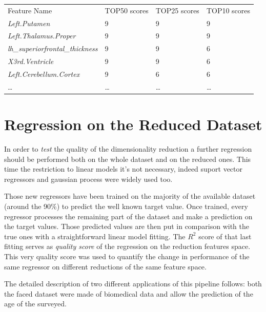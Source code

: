 \documentclass{article}
\begin{document}
\begin{table}[h]
\begin{tabular}{llll}
Feature Name                                        & TOP50 scores & TOP25 scores & TOP10 scores \\
\textit{Left.Putamen}                               & 9             & 9             & 9             \\
\textit{Left.Thalamus.Proper}                       & 9             & 9             & 9             \\
\textit{lh\_superiorfrontal\_thickness}             & 9             & 9             & 6             \\
\textit{X3rd.Ventricle}                             & 9             & 9             & 6             \\
\textit{Left.Cerebellum.Cortex}                     & 9             & 6             & 6             \\
\dots																								& \dots					&\dots 					&\dots
\end{tabular}
\end{table}



\section*{Regression on the Reduced Dataset}
In order to \emph{test} the quality of the dimensionality reduction a further regression should be performed both on the whole dataset and on the reduced ones. This time the restriction to linear models it's not necessary, indeed suport vector regressors and gaussian process were widely used too.

Those new regressors have been trained on the majority of the available dataset (around the 90\%) to predict the well known target value. Once trained, every regressor processes the remaining part of the dataset and make a prediction on the target values. Those predicted values are then put in comparison with the true ones with a straightforward linear model fitting. The $R^2$ score of that last fitting serves as \emph{quality score} of the regression on the reduction features space. This very quality score was used to quantify the change in performance of the same regressor on different reductions of the same feature space.

The detailed description of two different applications of this pipeline follows: both the faced dataset were made of biomedical data and allow the prediction of the age of the surveyed.
\end{document}
